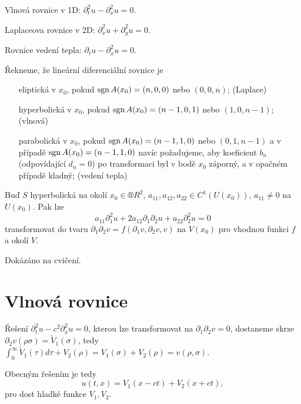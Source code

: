 \documentclass[12pt]{article}					%
\begin{document}
\begin{priklady}
	Vlnová rovnice v 1D: $\partial_t^2 u - \partial_x^2 u = 0$.

	Laplaceova rovnice v 2D: $\partial_x^2 u + \partial_y^2 u = 0$.

	Rovnice vedení tepla: $\partial_t u - \partial_x^2 u = 0$.
\end{priklady}

\begin{definice}
	Řekneme, že lineární diferenciální rovnice je
	\begin{itemize}
		\item[eliptická] v $x_0$, pokud $\operatorname{sgn} A(x_0) = (n, 0, 0)$ nebo $(0, 0, n)$; (Laplace)
		\item[hyperbolická] v $x_0$, pokud $\operatorname{sgn} A(x_0) = (n-1, 0, 1)$ nebo $(1, 0, n-1)$; (vlnová)
		\item[parabolická] v $x_0$, pokud $\operatorname{sgn} A(x_0) = (n-1, 1, 0)$ nebo $(0, 1, n-1)$ a v případě $\operatorname{sgn} A(x_0) = (n-1, 1, 0)$ navíc požadujeme, aby koeficient $b_n$ (odpovídající $d_n=0$) po transformaci byl v bodě $x_0$ záporný, a v opačném případě kladný; (vedení tepla)
	\end{itemize}
\end{definice}

\begin{veta}
	Buď $S$ hyperbolická na okolí $x_0 \in ®R^2$, $a_{11}, a_{12}, a_{22} \in C^1(U(x_0))$, $a_{11} ≠ 0$ na $U(x_0)$. Pak lze 
	$$ a_{11} \partial_1^2 u + 2a_{12} \partial_1\partial_2 u + a_{22} \partial_2^2 u = 0 $$
	transformovat do tvaru $\partial_1\partial_2 v = f(\partial_1v, \partial_2v, v)$ na $V(x_0)$ pro vhodnou funkci $f$ a okolí $V$.

	\begin{dukazin}
		Dokázáno na cvičení.
	\end{dukazin}
\end{veta}

\section{Vlnová rovnice}
\begin{tvrzeni}
	Řešení $\partial_t^2 u - c^2 \partial_x^2 u = 0$, kterou lze transformovat na $\partial_1\partial_2 v = 0$, dostaneme skrze $\partial_2 v(\rho \sigma) = \tilde{V}_1(\sigma)$, tedy $\int_0^∞ \tilde{V}_1(\tau) d\tau + V_2(\rho) = V_1(\sigma) + V_2(\rho) = v(\rho, \sigma)$.

	Obecným řešením je tedy
	$$ u(t, x) = V_1(x - ct) + V_2(x + ct), $$
	pro dost hladké funkce $V_1, V_2$.
\end{tvrzeni}
\end{document}
